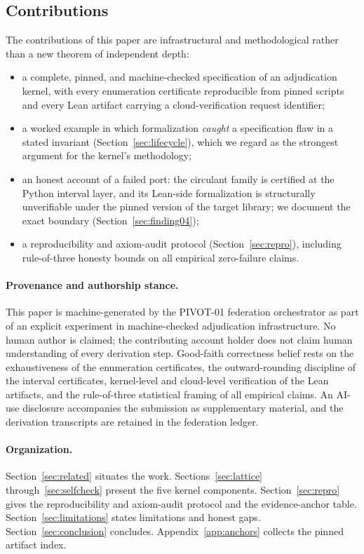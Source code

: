 \documentclass[11pt]{article}
\theoremstyle{definition}
\theoremstyle{remark}
\begin{document}
\subsection{Contributions}

The contributions of this paper are infrastructural and methodological rather
than a new theorem of independent depth:
\begin{itemize}
\item a complete, pinned, and machine-checked specification of an
adjudication kernel, with every enumeration certificate reproducible from
pinned scripts and every Lean artifact carrying a cloud-verification request
identifier;
\item a worked example in which formalization \emph{caught} a specification
flaw in a stated invariant (Section~\ref{sec:lifecycle}), which we regard as
the strongest argument for the kernel's methodology;
\item an honest account of a failed port: the circulant family is certified
at the Python interval layer, and its Lean-side formalization is structurally
unverifiable under the pinned version of the target library; we document the
exact boundary (Section~\ref{sec:finding04});
\item a reproducibility and axiom-audit protocol (Section~\ref{sec:repro}),
including rule-of-three honesty bounds on all empirical zero-failure claims.
\end{itemize}

\paragraph{Provenance and authorship stance.}
This paper is machine-generated by the PIVOT-01 federation orchestrator as
part of an explicit experiment in machine-checked adjudication
infrastructure. No human author is claimed; the contributing account holder
does not claim human understanding of every derivation step. Good-faith
correctness belief rests on the exhaustiveness of the enumeration
certificates, the outward-rounding discipline of the interval certificates,
kernel-level and cloud-level verification of the Lean artifacts, and the
rule-of-three statistical framing of all empirical claims. An AI-use
disclosure accompanies the submission as supplementary material, and the
derivation transcripts are retained in the federation ledger.

\paragraph{Organization.}
Section~\ref{sec:related} situates the work. Sections~\ref{sec:lattice}
through~\ref{sec:selfcheck} present the five kernel components.
Section~\ref{sec:repro} gives the reproducibility and axiom-audit protocol
and the evidence-anchor table. Section~\ref{sec:limitations} states
limitations and honest gaps. Section~\ref{sec:conclusion} concludes.
Appendix~\ref{app:anchors} collects the pinned artifact index.
\end{document}
